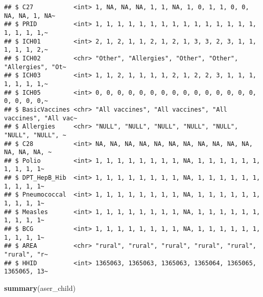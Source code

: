 \documentclass[
]{article}
\newenvironment{Shaded}{\begin{snugshade}}{\end{snugshade}}
\newcommand{\FunctionTok}[1]{\textcolor[rgb]{0.13,0.29,0.53}{\textbf{#1}}}
\newcommand{\NormalTok}[1]{#1}
\begin{document}
\begin{verbatim}
## $ C27           <int> 1, NA, NA, NA, 1, 1, NA, 1, 0, 1, 1, 0, 0, NA, NA, 1, NA~
## $ PRID          <int> 1, 1, 1, 1, 1, 1, 1, 1, 1, 1, 1, 1, 1, 1, 1, 1, 1, 1, 1,~
## $ ICH01         <int> 2, 1, 2, 1, 1, 2, 1, 2, 1, 3, 3, 2, 3, 1, 1, 1, 1, 1, 2,~
## $ ICH02         <chr> "Other", "Allergies", "Other", "Other", "Allergies", "Ot~
## $ ICH03         <int> 1, 1, 2, 1, 1, 1, 1, 2, 1, 2, 2, 3, 1, 1, 1, 1, 1, 1, 1,~
## $ ICH05         <int> 0, 0, 0, 0, 0, 0, 0, 0, 0, 0, 0, 0, 0, 0, 0, 0, 0, 0, 0,~
## $ BasicVaccines <chr> "All vaccines", "All vaccines", "All vaccines", "All vac~
## $ Allergies     <chr> "NULL", "NULL", "NULL", "NULL", "NULL", "NULL", "NULL", ~
## $ C28           <int> NA, NA, NA, NA, NA, NA, NA, NA, NA, NA, NA, NA, NA, NA, ~
## $ Polio         <int> 1, 1, 1, 1, 1, 1, 1, 1, NA, 1, 1, 1, 1, 1, 1, 1, 1, 1, 1~
## $ DPT_HepB_Hib  <int> 1, 1, 1, 1, 1, 1, 1, 1, NA, 1, 1, 1, 1, 1, 1, 1, 1, 1, 1~
## $ Pneumococcal  <int> 1, 1, 1, 1, 1, 1, 1, 1, NA, 1, 1, 1, 1, 1, 1, 1, 1, 1, 1~
## $ Measles       <int> 1, 1, 1, 1, 1, 1, 1, 1, NA, 1, 1, 1, 1, 1, 1, 1, 1, 1, 1~
## $ BCG           <int> 1, 1, 1, 1, 1, 1, 1, 1, NA, 1, 1, 1, 1, 1, 1, 1, 1, 1, 1~
## $ AREA          <chr> "rural", "rural", "rural", "rural", "rural", "rural", "r~
## $ HHID          <int> 1365063, 1365063, 1365063, 1365064, 1365065, 1365065, 13~
\end{verbatim}

\begin{Shaded}
\begin{Highlighting}[]
\FunctionTok{summary}\NormalTok{(aser\_child)}
\end{Highlighting}
\end{Shaded}
\end{document}
